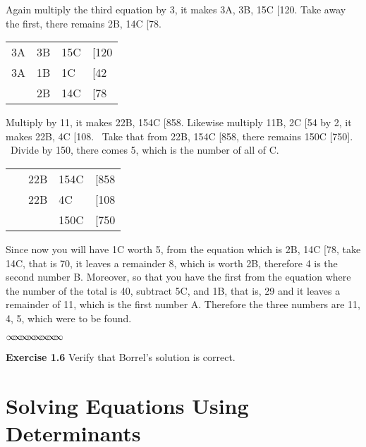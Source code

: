 \documentclass[11pt]{article}%
\theoremstyle{definition}
\newcommand{\sep}{\vspace{-3pt} \begin{center}
{\mathversion{normal}
$\infty \mspace{-5.5mu} \infty \mspace{-5.5mu}
\infty \mspace{-5.5mu} \infty \mspace{-5.5mu}
\infty \mspace{-5.5mu} \infty \mspace{-5.5mu}
\infty \mspace{-5.5mu} \infty$}
\end{center} \vspace{-3pt}}
\begin{document}
\textsf{Again multiply the third equation by 3, it makes 3A, 3B, 15C [120.
Take away the first, there remains 2B, 14C [78. }

\begin{center}%
\begin{tabular}
[c]{llll}%
\textsf{3A} & \textsf{3B} & \textsf{15C} & \textsf{[120}\\
\textsf{3A} & \textsf{1B} & \textsf{1C} & \textsf{[42}\\
\textsf{ } & \textsf{2B} & \textsf{14C} & \textsf{[78}%
\end{tabular}



\end{center}

\textsf{ Multiply by 11, it makes 22B, 154C [858. Likewise multiply 11B, 2C
[54 by 2, it makes 22B, 4C [108. \ Take that from 22B, 154C [858, there
remains 150C [750]. \ Divide by 150, there comes 5, which is the number of all
of C.}

\begin{center}%
\begin{tabular}
[c]{llll}%
\ \textsf{ } & \textsf{22B} & \textsf{154C} & \textsf{[858}\\
\textsf{ } & \textsf{22B} & \textsf{4C} & \textsf{[108}\\
\textsf{ } & \textsf{ } & \textsf{150C} & \textsf{[750}%
\end{tabular}



\end{center}

\bigskip\textsf{ Since now you will have 1C worth 5, from the equation which
is 2B, 14C [78, take 14C, that is 70, it leaves a remainder 8, which is worth
2B, therefore 4 is the second number B. Moreover, so that you have the first
from the equation where the number of the total is 40, subtract 5C, and 1B,
that is, 29 and it leaves a remainder of 11, which is the first number A.
Therefore the three numbers are 11, 4, 5, which were to be found.}%

\sep


\noindent\textbf{Exercise 1.6} Verify that Borrel's solution is
correct.\bigskip

\section{Solving Equations Using Determinants}
\end{document}
